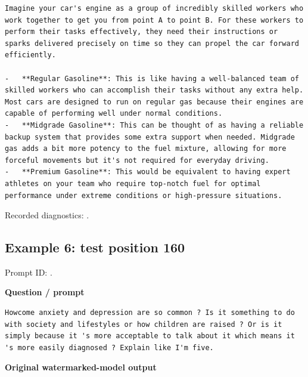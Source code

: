 \begin{Verbatim}
Imagine your car's engine as a group of incredibly skilled workers who work together to get you from point A to point B. For these workers to perform their tasks effectively, they need their instructions or sparks delivered precisely on time so they can propel the car forward efficiently.

-   **Regular Gasoline**: This is like having a well-balanced team of skilled workers who can accomplish their tasks without any extra help. Most cars are designed to run on regular gas because their engines are capable of performing well under normal conditions.
-   **Midgrade Gasoline**: This can be thought of as having a reliable backup system that provides some extra support when needed. Midgrade gas adds a bit more potency to the fuel mixture, allowing for more forceful movements but it's not required for everyday driving.
-   **Premium Gasoline**: This would be equivalent to having expert athletes on your team who require top-notch fuel for optimal performance under extreme conditions or high-pressure situations.
\end{Verbatim}

Recorded diagnostics:
\texttt{}.

\subsection{Example 6: test position
160}\label{record-docs-watermarking-qualitative-text-textseal2-bira-md-example-6-test-position-160}

Prompt ID:
\texttt{}.

\textbf{Question / prompt}

\begin{Verbatim}
Howcome anxiety and depression are so common ? Is it something to do with society and lifestyles or how children are raised ? Or is it simply because it 's more acceptable to talk about it which means it 's more easily diagnosed ? Explain like I'm five.
\end{Verbatim}

\textbf{Original watermarked-model output}


